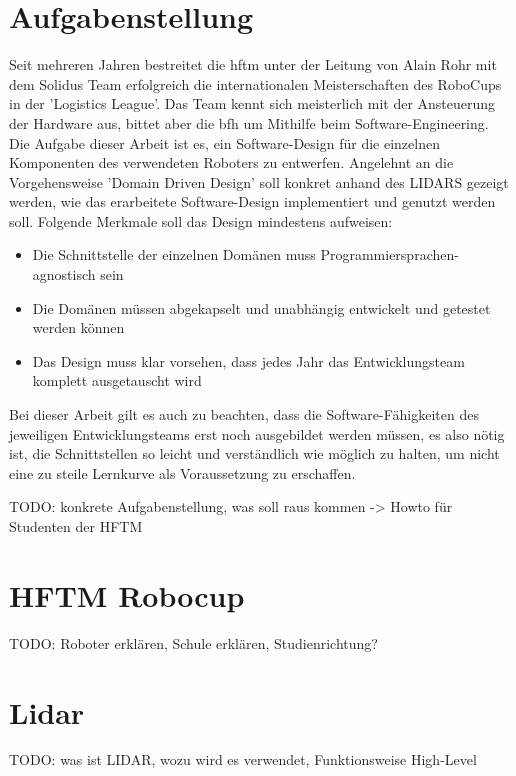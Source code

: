 \documentclass[11pt,english,german]{report}
\begin{document}
\section{Aufgabenstellung}
Seit mehreren Jahren bestreitet die \acrshort{hftm} unter der Leitung von Alain Rohr mit dem Solidus Team erfolgreich die internationalen Meisterschaften des RoboCups in der 'Logistics League'.
Das Team kennt sich meisterlich mit der Ansteuerung der Hardware aus, bittet aber die \acrshort{bfh} um Mithilfe beim Software-Engineering.
Die Aufgabe dieser Arbeit ist es, ein Software-Design für die einzelnen Komponenten des verwendeten Roboters zu entwerfen. Angelehnt an die Vorgehensweise 'Domain Driven Design' soll konkret anhand des LIDARS gezeigt werden, wie das erarbeitete Software-Design implementiert und genutzt werden soll. Folgende Merkmale soll das Design mindestens aufweisen:

\begin{itemize}
	\item
	Die Schnittstelle der einzelnen Domänen muss Programmiersprachen-agnostisch sein
	
	\item
	Die Domänen müssen abgekapselt und unabhängig entwickelt und getestet werden können
	
	\item
	Das Design muss klar vorsehen, dass jedes Jahr das Entwicklungsteam komplett ausgetauscht wird
\end{itemize}
Bei dieser Arbeit gilt es auch zu beachten, dass die Software-Fähigkeiten des jeweiligen Entwicklungsteams erst noch ausgebildet werden müssen, es also nötig ist, die Schnittstellen so leicht und verständlich wie möglich zu halten, um nicht eine zu steile Lernkurve als Voraussetzung zu erschaffen.


\bigskip
TODO:
konkrete Aufgabenstellung, was soll raus kommen -> Howto für Studenten der \gls{HFTM}

\section{HFTM Robocup}
TODO:
Roboter erklären, Schule erklären, Studienrichtung?

\section{Lidar}
TODO:
was ist \gls{LIDAR}, wozu wird es verwendet, Funktionsweise High-Level
\end{document}
